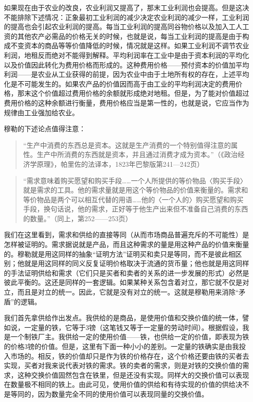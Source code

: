 如果现在由于农业的改良，农业利润又提高了，那末工业利润也会提高。但是这决不能排除下述情况：正象最初工业利润的减少决定农业利润的减少一样，工业利润的提高也会引起农业利润的提高。每当工业利润的提高同谷物价格以及加入工人工资的其他农产必需品的价格无关的时候，也就是说，每当工业利润的提高是由于构成不变资本的商品等等价值降低的时候，情况就是这样。如果工业利润不调节农业利润，地租反而绝对不能得到解释。平均利润率在工业中是由于资本利润的平均化以及价值因此转化为费用价格而形成的。这种费用价格——预付资本的价值加平均利润——是农业从工业获得的前提，因为农业中由于土地所有权的存在，上述平均化是不可能发生的。如果农产品的价值因而高于由工业的平均利润决定的费用价格，那末这个价值超过费用价格的余额就形成绝对地租。但是，为了能对价值超过费用价格的这种余额进行衡量，费用价格应当是第一性的，也就是说，它应当作为规律由工业强加给农业。


穆勒的下述论点值得注意：

\begin{quote}{“生产中消费的东西总是资本。这就是生产消费的一个特别值得注意的属性。生产中所消费的东西就是资本，并且通过消费才成为资本。”（《政治经济学原理》，帕里佐的法译本，1823年巴黎版第241—242页）}\end{quote}


\begin{quote}{“需求意味着购买愿望和购买手段……一个人所提供的等价物品〈购买手段〉就是需求的工具。他的需求量就是用这个等价物品的价值来衡量的。需求和等价物品是两个可以相互代替的用语……他的〈一个人的〉购买愿望和购买手段，换句话说，他的需求，正好等于他生产出来但不准备自己消费的东西的数量。”（同上，第252——253页）}\end{quote}

我们在这里看到，需求和供给的直接等同（从而市场商品普遍充斥的不可能性）是怎样被证明的。需求据说就是产品，而且这种需求的量是用这种产品的价值来衡量的。穆勒就是用这同样的抽象“证明方法”证明买和卖只是等同，而不是彼此相区别；他就是用这同样的同义反复证明价格取决于流通的货币量；他也就是用这同样的手法证明供给和需求（它们只是买者和卖者的关系的进一步发展的形式）必然是彼此平衡的。这还是同样的一套逻辑。如果某种关系包含着对立，那它就不仅是对立，而且是对立的统一。因此，它就是没有对立的统一。这就是穆勒用来消除“矛盾”的逻辑。

我们首先拿供给作出发点。我供给的是商品，是使用价值和交换价值的统一体，譬如说，一定量的铁，它等于3镑（这笔钱又等于一定量的劳动时间）。根据假设，我是一个制铁厂主。我供给一定的使用价值——铁，也供给一定的价值，即表现为铁的价格3镑的价值。但是，这里有下面一种小小的差别。一定量的铁确实是由我投入市场的。相反，铁的价值却只是作为铁的价格存在，这个价格还要由铁的买者去实现，买者对我来说代表对铁的需求。铁的卖者的需求，则是对铁的交换价值的需求，这种交换价值固然包含在铁里，但是还没有实现。同样大的交换价值可以表现在数量极不相同的铁上。由此可见，使用价值的供给和有待实现的价值的供给决不是等同的，因为数量完全不同的使用价值可以表现同量的交换价值。

